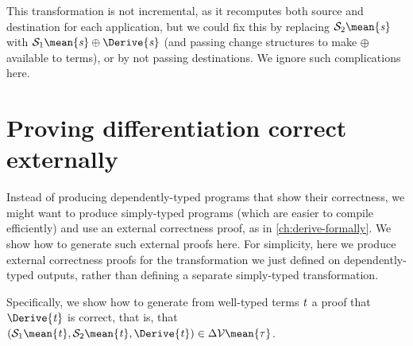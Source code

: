 This transformation is not incremental,
as it recomputes both source and destination for each application,
but we could fix this by replacing \ensuremath{\mathcal{S}_2 \mean{\Varid{s}}} with \ensuremath{\mathcal{S}_1 \mean{\Varid{s}}\oplus \Derive{\Varid{s}}} (and
passing change structures to make \ensuremath{\oplus } available to terms), or by not
passing destinations. We ignore such complications here.

\section{Proving differentiation correct externally}
Instead of producing dependently-typed programs that show their correctness, we
might want to produce simply-typed programs (which are easier to compile
efficiently) and use an external correctness proof, as in
\cref{ch:derive-formally}. We show how to generate such external proofs here.
For simplicity, here we produce external correctness proofs for the
transformation we just defined on dependently-typed outputs, rather than
defining a separate simply-typed transformation.

Specifically, we show how to generate
from well-typed terms \ensuremath{\Varid{t}} a proof that \ensuremath{\Derive{\Varid{t}}} is correct, that is, that
\ensuremath{(\mathcal{S}_1 \mean{\Varid{t}},\mathcal{S}_2 \mean{\Varid{t}},\Derive{\Varid{t}})\in \Delta\mathcal{V}\mean{\tau}}.

